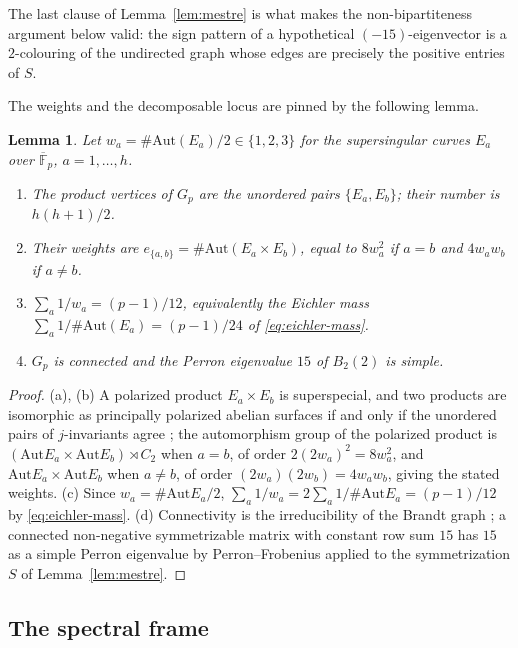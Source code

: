 \documentclass[11pt]{amsart}
\theoremstyle{plain}
\newtheorem{lemma}[theorem]{Lemma}
\theoremstyle{definition}
\newcommand{\F}{\mathbb{F}}
\newcommand{\Aut}{\mathrm{Aut}}
\begin{document}
	The last clause of Lemma~\ref{lem:mestre} is what makes the
	non-bipartiteness argument below valid: the sign pattern of a hypothetical
	$(-15)$-eigenvector is a $2$-colouring of the undirected graph whose edges
	are precisely the positive entries of $S$.
	
	The weights and the decomposable locus are pinned by the following lemma.
	
	\begin{lemma}\label{lem:vertices}
		Let $w_a=\#\Aut(E_a)/2\in\{1,2,3\}$ for the supersingular curves $E_a$
		over $\overline{\F}_p$, $a=1,\ldots,h$.
		\begin{enumerate}[label=\textup{(\alph*)},leftmargin=2.2em]
			\item The product vertices of $G_p$ are the unordered pairs
			$\{E_a,E_b\}$; their number is $h(h+1)/2$.
			\item Their weights are $e_{\{a,b\}}=\#\Aut(E_a\times E_b)$, equal to
			$8w_a^2$ if $a=b$ and $4w_aw_b$ if $a\ne b$.
			\item $\sum_a 1/w_a=(p-1)/12$, equivalently the Eichler mass
			$\sum_a 1/\#\Aut(E_a)=(p-1)/24$ of \eqref{eq:eichler-mass}.
			\item $G_p$ is connected and the Perron eigenvalue $15$ of $B_2(2)$ is
			simple.
		\end{enumerate}
	\end{lemma}
	
	\begin{proof}
		(a), (b) A polarized product $E_a\times E_b$ is superspecial, and two
		products are isomorphic as principally polarized abelian surfaces if and
		only if the unordered pairs of $j$-invariants agree \cite[\S3]{IKO1986};
		the automorphism group of the polarized product is
		$(\Aut E_a\times\Aut E_b)\rtimes C_2$ when $a=b$, of order
		$2(2w_a)^2=8w_a^2$, and $\Aut E_a\times\Aut E_b$ when $a\ne b$, of order
		$(2w_a)(2w_b)=4w_aw_b$, giving the stated weights. (c) Since
		$w_a=\#\Aut E_a/2$, $\sum_a 1/w_a=2\sum_a 1/\#\Aut E_a=(p-1)/12$ by
		\eqref{eq:eichler-mass}. (d) Connectivity is the irreducibility of the
		Brandt graph \cite[Thm.~44]{JordanZaytman}; a connected non-negative
		symmetrizable matrix with constant row sum $15$ has $15$ as a simple
		Perron eigenvalue by Perron--Frobenius applied to the symmetrization $S$
		of Lemma~\ref{lem:mestre}.
	\end{proof}
	
	\subsection{The spectral frame}
	\label{ss:spectral-frame}
	
\end{document}
